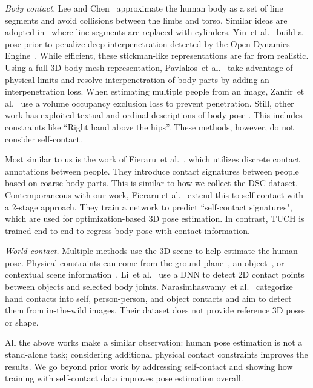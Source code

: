 \documentclass[final]{cvpr}
\renewcommand{\etal}{et al.\xspace}
\theoremstyle{definition}
\begin{document}
\textit{Body contact.} Lee and Chen~\cite{lee1985determination} approximate the human body as a set of line segments and avoid collisions between the limbs and torso. 
Similar ideas are adopted in~\cite{belagiannis20163Dpami,Ganapathi2012eccv} where line segments are replaced with cylinders. Yin~\etal~\cite{yin2018sampling} build a pose prior to penalize 
deep interpenetration detected by the Open Dynamics Engine~\cite{smith2005open}. 
While efficient, these stickman-like representations are far from realistic. 
Using a full 3D body mesh representation, Pavlakos~\etal~\cite{SMPL-X:2019} take advantage of physical limits and resolve interpenetration of body parts by adding an interpenetration loss. 
When estimating multiple people from an image, Zanfir~\etal~\cite{zanfir2018monocular} use a volume occupancy exclusion loss to prevent penetration.
Still, other work has exploited textual and ordinal descriptions of body pose \cite{pavlakos2018ordinal,PonsMoll_CVPR2014}.
This includes constraints like ``Right hand above the hips''.  
These methods, however, do not consider self-contact.

Most similar to us is the work of Fieraru~\etal~\cite{Fieraru_2020_CVPR}, which utilizes discrete contact annotations between people.
They introduce contact signatures between people based on coarse body parts. This is similar to how we collect the DSC dataset.
Contemporaneous with our work, Fieraru et al.~\cite{Fieraru_2021_AAAI} extend this to self-contact with a 2-stage approach.
They train a network to predict ``self-contact signatures", which are used for optimization-based 3D pose estimation.
In contrast, TUCH is trained end-to-end to regress body pose with contact information.

\textit{World contact.} Multiple methods use the 3D scene to help estimate the human pose. 
Physical constraints can come from the ground plane~\cite{vondrak2012dynamical,zanfir2018monocular}, an object~\cite{PROX:2019,kim2014shape2pose,kjellstrom2010tracking}, or contextual scene information~\cite{gupta2008context,yamamoto2000scene}. 
Li~\etal~\cite{li2019estimating} use a DNN to detect 2D contact points between objects and selected body joints. 
Narasimhaswamy~\etal~\cite{Narasimhaswamy2020nips} categorize hand contacts into self, person-person, and object contacts and aim to detect them from in-the-wild images. Their dataset does not provide reference 3D poses or shape. 

All the above works make a similar observation: human pose estimation is not a stand-alone task; considering additional physical contact constraints improves the results. 
We go beyond prior work by addressing self-contact and showing how training with self-contact data improves pose estimation overall.
\end{document}
